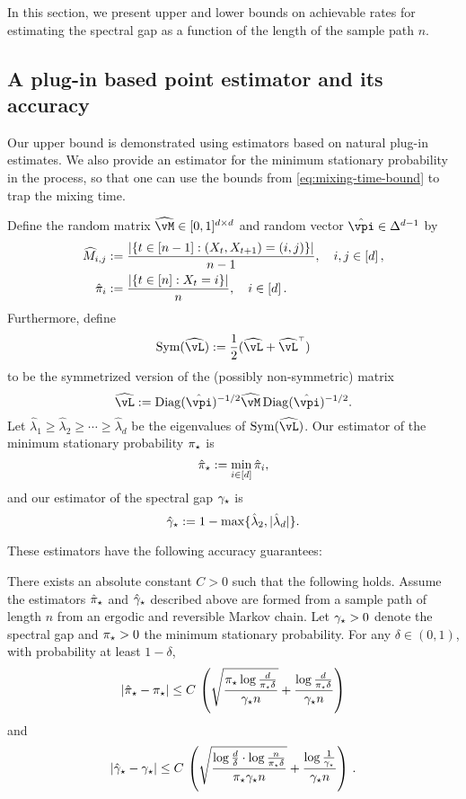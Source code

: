 
In this section, we present upper and lower bounds on achievable rates
for estimating the spectral gap as a function of the length of the
sample path $n$.

\subsection{A plug-in based point estimator and its accuracy}
\label{sec:rates-upper}

Our upper bound is demonstrated using estimators based on natural
plug-in estimates.
We also provide an estimator for the minimum stationary probability
in the process, so that one can use the bounds from
\cref{eq:mixing-time-bound} to trap
the mixing time.

Define the random matrix $\wh\vM \in [0,1]^{d \times d}$ and random
vector $\hat\vpi \in \Delta^{d-1}$ by
\begin{align*}
  \widehat{M}_{i,j}
  & := \frac{|\{ t \in [n-1] : (X_t,X_{t+1}) = (i,j) \}|}{n-1}
  , \quad i,j \in [d]\,,
  \\
  \hat{\pi}_i
  & := \frac{|\{ t \in [n] : X_t = i \}|}{n}
  , \quad i \in [d]
  \,.
\end{align*}
Furthermore, define
\[
  \Sym(\wh\vL) := \frac12 \parens{ \wh\vL + \wh\vL^\t }
\]
to be the symmetrized version of the (possibly non-symmetric) matrix
\[
  \wh\vL := \Diag(\hat\vpi)^{-1/2} \wh\vM \Diag(\hat\vpi)^{-1/2}
  .
\]
Let $\hat\lambda_1 \geq \hat\lambda_2 \geq \dotsb \geq \hat\lambda_d$
be the eigenvalues of $\Sym(\wh\vL)$.
Our estimator of the minimum stationary probability $\pi_{\star}$ is
\[
  \hat\pi_{\star} := \min_{i \in [d]} \hat\pi_i ,
\]
and our estimator of the spectral gap $\gamma_{\star}$ is
\[
  \hat\gamma_{\star} := 1 - \max\{ \hat\lambda_2, |\hat\lambda_d| \} .
\]

These estimators have the following accuracy guarantees:
\begin{theorem}
  \label{thm:err}
  There exists an absolute constant $C>0$ such that the following
  holds.
  Assume the estimators $\hat\pi_{\star}$ and $\hat\gamma_{\star}$ described above are
  formed from a sample path of length $n$ from an ergodic and
  reversible Markov chain.
  Let $\gamma_{\star}>0$ denote the spectral gap and $\pi_{\star}>0$ the minimum
  stationary probability.
  For any $\delta \in (0,1)$, with probability at least $1-\delta$,
  \begin{equation}\label{eq:piminbound}
    \left|\hat\pi_{\star}-\pi_{\star}\right|
    \le
    C \,
    \left(
      \sqrt{\frac{\pi_{\star}\log\frac{d}{\pi_{\star}\delta}}{\gamma_{\star} n}}
      +
      \frac{\log\frac{d}{\pi_{\star}\delta}}{\gamma_{\star} n}
    \right)
  \end{equation}
  and
  \begin{equation}\label{eq:gapbound}
    \left|\hat\gamma_{\star}-\gamma_{\star}\right|
    \leq
    C \,
    \left(
      \sqrt{\frac{\log\frac{d}{\delta}\cdot\log\frac{n}{\pi_{\star}\delta}}{\pi_{\star}\gamma_{\star} n}}
      + \frac{\log\frac{1}{\gamma_{\star}}}{\gamma_{\star} n}  
    \right)
    \,.
  \end{equation}
\end{theorem}

